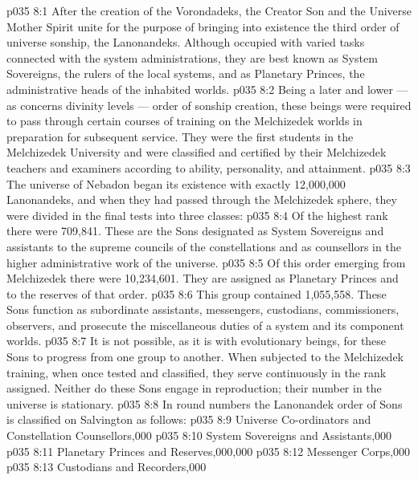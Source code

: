 \vs p035 8:1 After the creation of the Vorondadeks, the Creator Son and the Universe Mother Spirit unite for the purpose of bringing into existence the third order of universe sonship, the Lanonandeks. Although occupied with varied tasks connected with the system administrations, they are best known as System Sovereigns, the rulers of the local systems, and as Planetary Princes, the administrative heads of the inhabited worlds.
\vs p035 8:2 Being a later and lower --- as concerns divinity levels --- order of sonship creation, these beings were required to pass through certain courses of training on the Melchizedek worlds in preparation for subsequent service. They were the first students in the Melchizedek University and were classified and certified by their Melchizedek teachers and examiners according to ability, personality, and attainment.
\vs p035 8:3 The universe of Nebadon began its existence with exactly 12,000,000 Lanonandeks, and when they had passed through the Melchizedek sphere, they were divided in the final tests into three classes:
\vs p035 8:4 \bibnobreakspace {} Of the highest rank there were 709,841. These are the Sons designated as System Sovereigns and assistants to the supreme councils of the constellations and as counsellors in the higher administrative work of the universe.
\vs p035 8:5 \bibnobreakspace {} Of this order emerging from Melchizedek there were 10,234,601. They are assigned as Planetary Princes and to the reserves of that order.
\vs p035 8:6 \bibnobreakspace {} This group contained 1,055,558. These Sons function as subordinate assistants, messengers, custodians, commissioners, observers, and prosecute the miscellaneous duties of a system and its component worlds.
\vs p035 8:7 \pc It is not possible, as it is with evolutionary beings, for these Sons to progress from one group to another. When subjected to the Melchizedek training, when once tested and classified, they serve continuously in the rank assigned. Neither do these Sons engage in reproduction; their number in the universe is stationary.
\vs p035 8:8 In round numbers the Lanonandek order of Sons is classified on Salvington as follows:
\vs p035 8:9 \pc Universe Co\hyp{}ordinators and Constellation Counsellors,000
\vs p035 8:10 System Sovereigns and Assistants,000
\vs p035 8:11 Planetary Princes and Reserves,000,000
\vs p035 8:12 Messenger Corps,000
\vs p035 8:13 Custodians and Recorders,000
